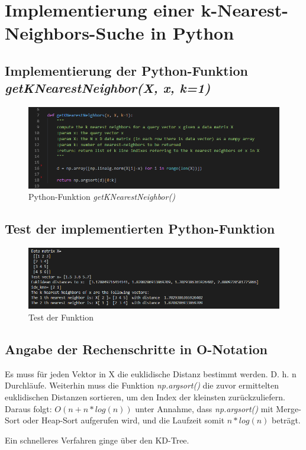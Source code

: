 \section{Implementierung einer k-Nearest-Neighbors-Suche in Python}


\subsection{
    Implementierung der Python-Funktion \textit{getKNearestNeighbor(X, x, k=1)}
}

\begin{figure}[H]
    \centering
    \includegraphics[width=1\linewidth]{files/aufgabe1a.png}
    \caption{Python-Funktion \textit{getKNearestNeighbor()}}
\end{figure}

\subsection{Test der implementierten Python-Funktion}

\begin{figure}[H]
    \centering
    \includegraphics[width=1\linewidth]{files/aufgabe1b.png}
    \caption{Test der Funktion}
\end{figure}

\subsection{Angabe der Rechenschritte in O-Notation}

Es muss für jeden Vektor in X die euklidische Distanz bestimmt werden.
D. h. n Durchläufe.
Weiterhin muss die Funktion \textit{np.argsort()} die zuvor ermittelten
euklidischen Distanzen sortieren, um den Index der kleinsten zurückzuliefern.
Daraus folgt: $O(n + n * log(n))$ unter Annahme, dass \textit{np.argsort()} 
mit Merge-Sort oder Heap-Sort aufgerufen wird, und die Laufzeit somit $n * log(n)$ beträgt.

\noindent
Ein schnelleres Verfahren ginge über den KD-Tree.
